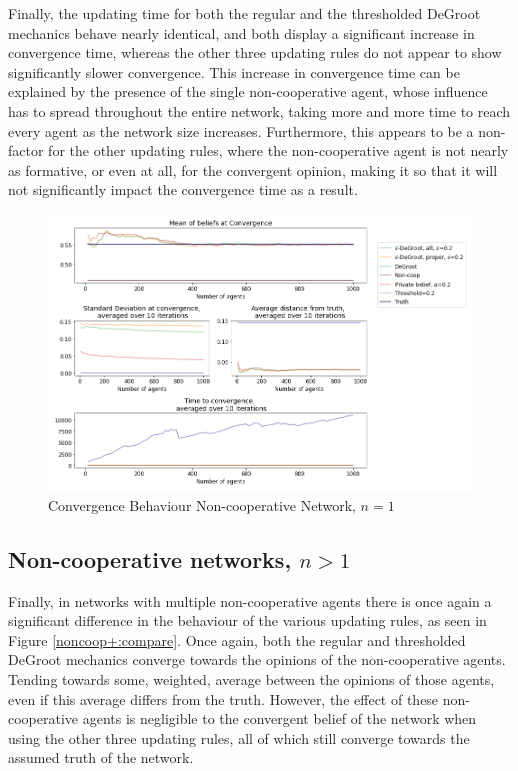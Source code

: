 \documentclass{article}
\begin{document}
\noindent Finally, the updating time for both the regular and the thresholded DeGroot mechanics behave nearly identical, and both display a significant increase in convergence time, whereas the other three updating rules do not appear to show significantly slower convergence. This increase in convergence time can be explained by the presence of the single non-cooperative agent, whose influence has to spread throughout the entire network, taking more and more time to reach every agent as the network size increases. Furthermore, this appears to be a non-factor for the other updating rules, where the non-cooperative agent is not nearly as formative, or even at all, for the convergent opinion, making it so that it will not significantly impact the convergence time as a result.

\begin{center}
    \begin{figure}[!htbp]
        \centering
        \includegraphics[width=1.2\textwidth]{ThesisKI/Images/WisdomCompare1.png}
        \caption{Convergence Behaviour Non-cooperative Network, $n=1$}
        \label{noncoop1:compare}
    \end{figure}
\end{center}

\newpage

\subsection{Non-cooperative networks, $n > 1$}

Finally, in networks with multiple non-cooperative agents there is once again a significant difference in the behaviour of the various updating rules, as seen in Figure \ref{noncoop+:compare}. Once again, both the regular and thresholded DeGroot mechanics converge towards the opinions of the non-cooperative agents. Tending towards some, weighted, average between the opinions of those agents, even if this average differs from the truth. However, the effect of these non-cooperative agents is negligible to the convergent belief of the network when using the other three updating rules, all of which still converge towards the assumed truth of the network. 
\end{document}
